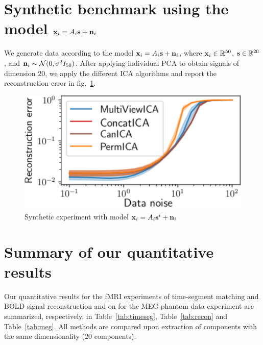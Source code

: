 \documentclass{report}
\begin{document}
\section{Synthetic benchmark using the model $\mathbf{x}_i = A_i\mathbf{s} + \mathbf{n}_i$}
\label{app:complex_cov}
We generate data according to the model $\mathbf{x}_i = A_i\mathbf{s} + \mathbf{n}_i$, where $\mathbf{x}_i \in \mathbb{R}^{50}$, $\mathbf{s} \in \mathbb{R}^{20}$, and $\mathbf{n}_i\sim \mathcal{N}(0, \sigma^2 I_{50})$. After applying individual PCA to obtain signals of dimension $20$, we apply the different ICA algorithms and report the reconstruction error in fig.~\ref{fig:reconstruction_synth}.

\begin{figure}
  \center
  \includegraphics[width=0.5\linewidth]{figures/mvica/distance.pdf}
  \caption{Synthetic experiment with model $\mathbf{x}_i = A_i\mathbf{s}^i + \mathbf{n}_i$} %
  \label{fig:reconstruction_synth}
\end{figure}

\section{Summary of our quantitative results}
\label{sec:app_real_data}
Our quantitative results for the fMRI experiments of time-segment matching and BOLD signal reconstruction and on for the MEG phantom data experiment are summarized, respectively, in Table~\ref{tab:timeseg}, Table~\ref{tab:recon} and Table~\ref{tab:meg}. All methods are compared upon extraction of components with the same dimensionality ($20$ components).
\end{document}
